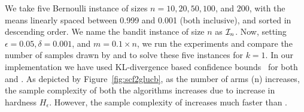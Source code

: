 We take five Bernoulli instance of  sizes $n = 10, 20, 50, 100$, and $200$, with  the means linearly
spaced between 0.999 and 0.001  (both inclusive), and sorted in descending order.
We name the bandit instance of size $n$ as $\mathcal{I}_n$.
Now, setting $\epsilon = 0.05, \delta = 0.001$, and $m = 0.1 \times n$,
we run the experiments and compare the number of samples drawn by \FF and \GLUCB to solve
these five instances for $k=1$.
In our implementation we have used KL-divergence based confidence bounds~\cite{bib:klucb1,bib:klucb2} for both \FF and \GLUCB.
As depicted by Figure~\ref{fig:scf2glucb}, as the number of arms (n) increases,
the sample complexity of both the algorithms increases due to increase
in hardness $H_\epsilon$.
However, the sample complexity of \FF increases much faster than \GLUCB.

